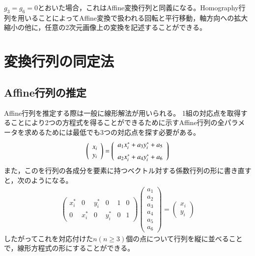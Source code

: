 \documentclass[fleqn]{jreport}
\begin{document}
$g_3=g_6=0$とおいた場合，これはAffine変換行列と同義になる。Homography行列を用いることによってAffine変換で扱われる回転と平行移動，軸方向への拡大縮小の他に，任意の2次元画像上の変換を記述することができる。


\section{変換行列の同定法}
\subsection{Affine行列の推定}
Affine行列を推定する際は一般に線形解法が用いられる。
1組の対応点を取得することにより2つの方程式を得ることができるために示すAffine行列の全パラメータを求めるためには最低でも3つの対応点を探す必要がある。
\begin{align}
\left(
\begin{array}{c}
x_i\\
y_i
\end{array}
\right)=\left(
\begin{array}{ccc}
\vspace{2mm}
a_{1}x^*_i+a_{3}y^*_i+a_{5} \\ 
a_{2}x^*_i+a_{4}y^*_i+a_{6}
\end{array}
\right) \label{eq:AffineEquation}
\end{align}
また，このを行列の各成分を要素に持つベクトル対する係数行列の形に書き直すと，次のようになる。
\begin{align}
\begin{pmatrix}
x^*_i & 0 & y^*_i & 0 & 1 & 0 \\ 
0 & x^*_i & 0 & y^*_i & 0 & 1
\end{pmatrix} \begin{pmatrix}
a_1 \\ 
a_2 \\ 
a_3 \\ 
a_4 \\ 
a_5 \\ 
a_6
\end{pmatrix} = \begin{pmatrix}
x_i \\ 
y_i
\end{pmatrix} \label{eq:affineEq2}
\end{align}
したがってこれを対応付けた$n (n \geq 3) $個の点について行列を縦に並べることで，線形方程式の形にすることができる。
\end{document}
